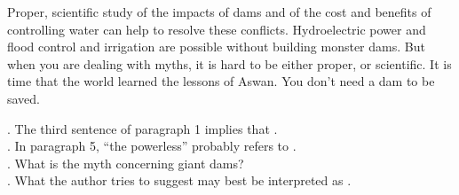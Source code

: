 Proper, scientific study of the impacts of dams and of the cost and benefits of controlling water can help to resolve these conflicts. Hydroelectric power and flood control and irrigation are possible without building monster dams. But when you are dealing with myths, it is hard to be either proper, or scientific. It is time that the world learned the lessons of Aswan. You don’t need a dam to be saved.
\begin{questions}    .	The third sentence of paragraph 1 implies that \ltk{}.\\
  .	In paragraph 5, “the powerless” probably refers to \ltk{}.\\
  .	What is the myth concerning giant dams?\\
  .	What the author tries to suggest may best be interpreted as \ltk{}.\\
\end{questions}

